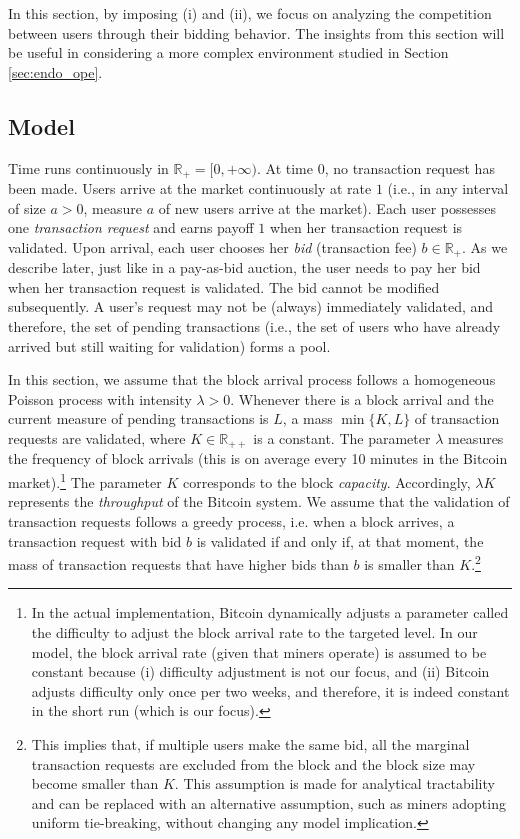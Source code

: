 \documentclass[12pt, letterpaper]{article}
\begin{document}
In this section, by imposing (i) and (ii), we focus on analyzing the competition between users through their bidding behavior. The insights from this section will be useful in considering a more complex environment studied in  Section \ref{sec:endo_ope}.


\subsection{Model}\label{subsec: model one-shot validation model with always-working miners}


Time runs continuously in $\mathbb{R}_+ = [0, +\infty)$. At time $0$, no transaction request has been made. Users arrive at the market continuously at rate $1$ (i.e., in any interval of size $a>0$, measure $a$ of new users arrive at the market).  Each user possesses one \emph{transaction request} and earns payoff $1$ when her transaction request is validated. Upon arrival, each user chooses her \emph{bid} (transaction fee) $b \in \mathbb{R}_+$. As we describe later, just like in a pay-as-bid auction, the user needs to pay her bid when her transaction request is validated. The bid cannot be modified subsequently. A user's request may not be (always) immediately validated, and therefore, the set of pending transactions (i.e., the set of users who have already arrived but still waiting for validation) forms a pool.


In this section, we assume that the block arrival process follows a homogeneous Poisson process with intensity $\lambda > 0$. Whenever there is a block arrival and the current measure of pending transactions is $L$, a mass $\min\{K, L\}$ of transaction requests are validated, where $K\in \mathbb R_{++}$ is a constant. The parameter $\lambda$ measures the frequency of block arrivals (this is on average every 10 minutes in the Bitcoin market).\footnote{In the actual implementation, Bitcoin dynamically adjusts a parameter called the difficulty to adjust the block arrival rate to the targeted level. In our model, the block arrival rate (given that miners operate) is assumed to be constant because (i) difficulty adjustment is not our focus, and (ii) Bitcoin adjusts difficulty only once per two weeks, and therefore, it is indeed constant in the short run (which is our focus).} The parameter $K$ corresponds to the block \emph{capacity}. Accordingly, $\lambda K$ represents the \emph{throughput} of the Bitcoin system. We assume that the validation of transaction requests follows a greedy process, i.e. when a block arrives, a transaction request with bid $b$ is validated if and only if, at that moment, the mass of transaction requests that have higher bids than $b$ is smaller than $K$.\footnote{This implies that, if multiple users make the same bid, all the marginal transaction requests are excluded from the block and the block size may become smaller than $K$. This assumption is made for analytical tractability and can be replaced with an alternative assumption, such as miners adopting uniform tie-breaking, without changing any model implication.}
\end{document}
